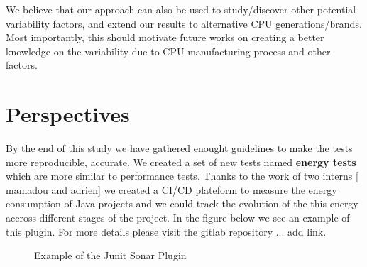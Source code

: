 We believe that our approach can also be used to study/discover other potential variability factors, and extend our results to alternative CPU generations/brands.
Most importantly, this should motivate future works on creating a better knowledge on the variability due to CPU manufacturing process and other factors.


\section{Perspectives}
By the end of this study we have gathered enought guidelines to make the tests more reproducible, accurate.
We created a set of new tests named \textbf{energy tests} which are more similar to performance tests. Thanks to the work of two interns [ mamadou and adrien] we created a CI/CD plateform to measure the energy consumption of Java projects and we could track the evolution of the this energy accross different stages of the project.
In the figure below we see an example of this plugin.
For more details please visit the gitlab repository ... add link.

\begin{figure}%
    \caption{Example of the Junit Sonar Plugin}\label{fig:sonar_plugin}
\end{figure}


